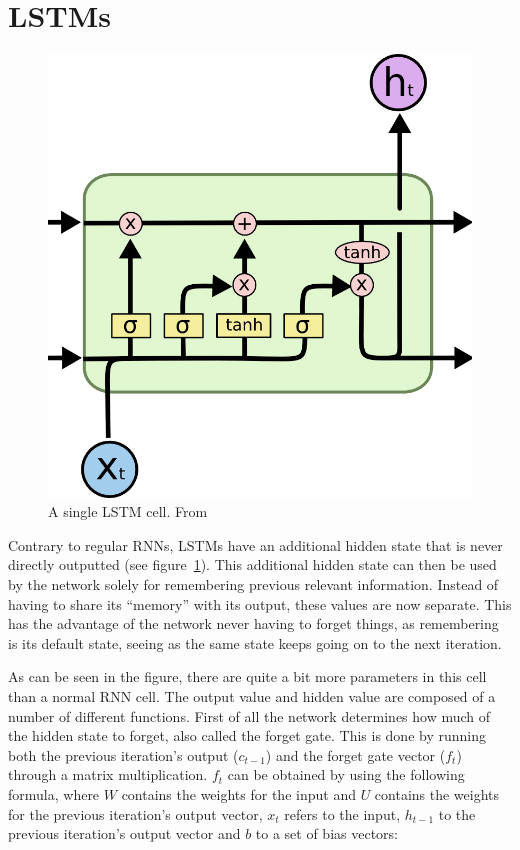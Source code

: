 \section{LSTMs}

\begin{figure}
	\begin{center}
		\includegraphics[scale=0.5]{rnn/lstm_cell}
	\end{center}
	\caption{A single LSTM cell. From~\cite{olah2015understanding}\label{fig:lstm_cell}}
\end{figure}

Contrary to regular RNNs, LSTMs have an additional hidden state that is never directly outputted (see figure~\ref{fig:lstm_cell}). This additional hidden state can then be used by the network solely for remembering previous relevant information. Instead of having to share its \enquote{memory} with its output, these values are now separate. This has the advantage of the network never having to forget things, as remembering is its default state, seeing as the same state keeps going on to the next iteration.

As can be seen in the figure, there are quite a bit more parameters in this cell than a normal RNN cell. The output value and hidden value are composed of a number of different functions. First of all the network determines how much of the hidden state to forget, also called the forget gate. This is done by running both the previous iteration's output (\(c_{t-1}\)) and the forget gate vector (\(f_t\)) through a matrix multiplication. \(f_t\) can be obtained by using the following formula, where \(W\) contains the weights for the input and \(U\) contains the weights for the previous iteration's output vector, \(x_t\) refers to the input, \(h_{t-1}\) to the previous iteration's output vector and \(b\) to a set of bias vectors:

